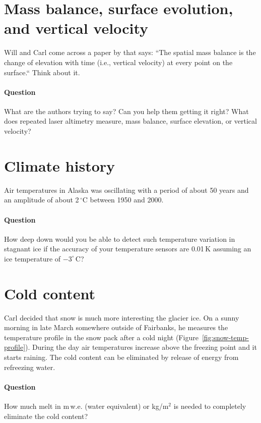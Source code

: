 \documentclass[parskip=half]{scrartcl}
\newcommand{\cels}[1]{\ensuremath{#1^{\circ}\,\mathrm{C}}}
\begin{document}
\section{Mass balance, surface evolution, and vertical velocity}

Will and Carl come across a paper by \cite{Konrad1999} that says: ``The spatial mass balance is the change of elevation with time (i.e., vertical velocity) at every point on the surface.`` Think about it. 

\paragraph{Question} What are the authors trying to say? Can you help them getting it right? What does repeated laser altimetry measure, mass balance, surface elevation, or vertical velocity?

\section{Climate history}

Air temperatures in Alaska was oscillating with a period of about 50 years and an amplitude of about 2$\,^\circ\text{C}$ between 1950 and 2000. 

\paragraph{Question} How deep down would you be able to detect such temperature variation in stagnant ice if the accuracy of your temperature sensors are 0.01$\,\text{K}$ assuming an ice temperature of $-\cels{3}$?

\section{Cold content}

Carl decided that snow is much more interesting the glacier ice. On a sunny morning in late March somewhere outside of Fairbanks, he measures the temperature profile in the snow pack after a cold night (Figure~\ref{fig:snow-temp-profile}). During the day air temperatures increase above the freezing point and it starts raining. The cold content can be eliminated by release of energy from refreezing water.

\paragraph{Question} How much melt in m\,w.e. (water equivalent) or kg/m$^{2}$ is needed to completely eliminate the cold content?
\end{document}
